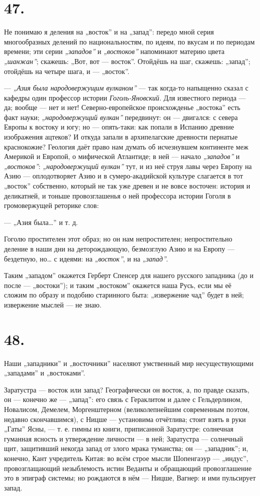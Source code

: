 \documentclass[12pt,a4paper,oneside]{book}
\begin{document}
\section*{47.}

Не понимаю я деления на „восток” и на „запад”: передо мной серия многообразных делений по национальностям, по идеям, по вкусам и по периодам времени; эти серии \emph{„западов”} и \emph{„востоков”} напоминают материю цвета \emph{„шанжан”}; скажешь: „Вот, вот — восток”. Отойдёшь на шаг, скажешь: „запад”; отойдёшь на четыре шага, и — „восток”.

— \emph{„Азия была народовержущим вулканом”} — так когда-то напыщенно сказал с кафедры один профессор истории \emph{Гоголь-Яновский}. Для известного периода — да; вообще — нет и нет! Северно-европейское происхожденье „востока” есть факт науки; \emph{„народовержущий вулкан”} передвинут: он — двигался: с севера Европы к востоку и югу; но — опять-таки: как попали в Испанию древние изображения ацтеков? И откуда запали в архипелагские древности пернатые краснокожие? Геология даёт право нам думать об исчезнувшем континенте меж Америкой и Европой, о мифической Атлантиде; в ней — начало \emph{„западов”} и \emph{„востоков”}: \emph{„народовержущий вулкан”} тут, и из неё струя лавы через Европу на Азию — оплодотворяет Азию и в сумеро-акадийской культуре слагается в тот „восток” собственно, который не так уже древен и не вовсе восточен: история и деликатней, и тоньше провозглашенья о ней профессора истории Гоголя в громовержущей реторике слов:

— „Азия была…” и т. д.

Гоголю простителен этот образ; но он нам непростителен; непростительно деление в наши дни на деторождающую, безмозглую Азию и на Европу — бездетную, но… с идеями: на \emph{„восток”}, и на \emph{„запад”}.

Таким „западом” окажется Герберт Спенсер для нашего русского западника (до и после — „востоки”); и таким „востоком” окажется наша Русь, если мы её сложим по образу и подобию старинного быта: „извержение чад” будет в ней; извержение мыслей — не знаю.

\section*{48.}

Наши „западники” и „восточники” населяют умственный мир несуществующими „западами” и „востоками”.

Заратустра — восток или запад? Географически он восток, а, по правде сказать, он — конечно же — „запад”: его связь с Гераклитом и далее с Гельдерлином, Новалисом, Демелем, Моргенштерном (великолепнейшим современным поэтом, недавно скончавшимся), с Ницше — установима отчётлива; стоит взять в руки „Гаты” Ясны, — т. е. гимны из книги, приписанной Заратустре: солнечная гуманная ясность и утверждение личности — в ней; Заратустра — солнечный щит, защитивший некогда запад от злого мрака туманства; он — „западник”; и, конечно, Кант учредитель Китая: во всём строе мысли Шопенгаэур — „индус”, провозглащающий незыблемость истин Веданты и обращающий провозглашение это в эпиграф системы; но рождаются в нём — Ницше, Вагнер: и ими пульсирует запад.
\end{document}
